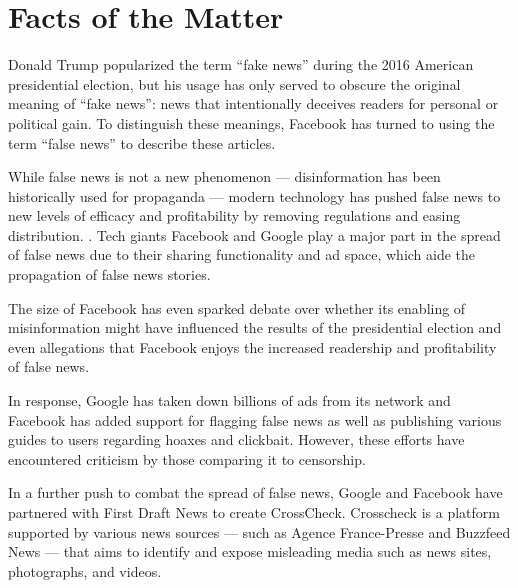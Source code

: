

\section{Facts of the Matter}

%
%
%

Donald Trump popularized the term ``fake news'' during the 2016 American presidential election, \cite{tc_what_is_fake_news} but his usage has only served to obscure the original meaning of ``fake news'': news that intentionally deceives readers for personal or political gain. \cite{tc_what_is_fake_news, npr_fake_news} To distinguish these meanings, Facebook has turned to using the term ``false news'' to describe these articles. \cite{fb_spot_fake_news}

While false news is not a new phenomenon --- disinformation has been historically used for propaganda \cite{bbc_fn_propaganda} --- modern technology has pushed false news to new levels of efficacy and profitability by removing regulations and easing distribution. \cite{telegraph_fake_news}. Tech giants Facebook and Google play a major part in the spread of false news due to their sharing functionality and ad space, which aide the propagation of false news stories. \cite{cbs_fake_news, tc_google_took_down_ads}

The size of Facebook has even sparked debate over whether its enabling of misinformation might have influenced the results of the presidential election \cite{bbc_facebook_fake_news_crisis, wp_russian_election_propaganda} and even allegations that Facebook enjoys the increased readership and profitability of false news. \cite{tc_facebook_responsibility}

In response, Google has taken down billions of ads from its network \cite{tc_google_took_down_ads} and Facebook has added support for flagging false news as well as publishing various guides to users regarding hoaxes and clickbait. \cite{tc_fb_down_ranks_fake_news,fb_reduce_clickbait,fb_addressing_hoaxes,fb_spot_fake_news} However, these efforts have encountered criticism by those comparing it to censorship. \cite{vox_sentences_fn}

In a further push to combat the spread of false news, Google and Facebook have partnered with First Draft News to create CrossCheck. \cite{crosscheck_launch} Crosscheck is a platform supported by various news sources --- such as Agence France-Presse and Buzzfeed News --- that aims to identify and expose misleading media such as news sites, photographs, and videos. \cite{tc_google_fb_partner,pcw_france_google_facebook}
